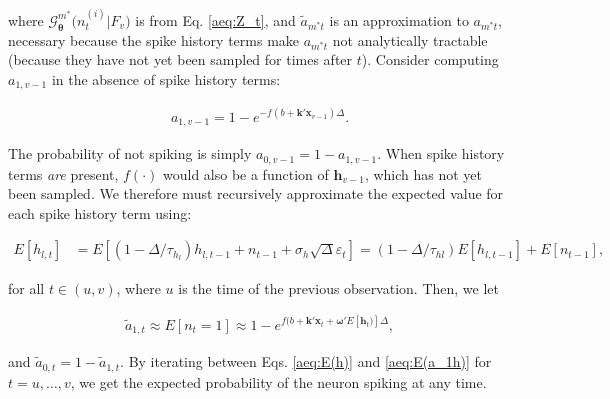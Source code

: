 \documentclass[10pt]{article}
\providecommand{\ve}[1]{\boldsymbol{#1}}
\providecommand{\ve}[1]{\boldsymbol{#1}}
\newcommand{\thetn}{\ve{\theta}}
\newcommand{\m}{m^{\ast}}
\begin{document}
%
\noindent where $\mathcal{G}_{\thetn}^{\m}\big(n_t^{(i)} | F_v\big)$ is from Eq. \ref{aeq:Z_t}, and $\widetilde{a}_{\m t}$ is an approximation to $a_{\m t}$, necessary because the spike history terms make $a_{\m t}$ not analytically tractable (because they have not yet been sampled for times after $t$).  Consider computing $a_{1,v-1}$ in the absence of spike history terms:

\begin{align} \label{aeq:E(a_1)}
a_{1,v-1} = 1-e^{-f(b+\ve{k}'\ve{x}_{v-1})\Delta}.
\end{align}

\noindent The probability of not spiking is simply $a_{0,v-1}=1-a_{1,v-1}$.  When spike history terms \emph{are} present, $f(\cdot)$ would also be a function of $\ve{h}_{v-1}$, which has not yet been sampled.  We therefore must recursively approximate the expected value for each spike history term using:

\begin{align} \label{aeq:E(h)}
E[h_{l,t}] &= E\left[(1-\Delta/\tau_{h_l}) h_{l,t-1} + n_{t-1} + \sigma_h \sqrt{\Delta}\varepsilon_t\right]  = (1-\Delta/\tau_{hl}) E[h_{l,t-1}] + E[n_{t-1}],
\end{align}

\noindent for all $t\in(u,v)$, where $u$ is the time of the previous observation. Then, we let

\begin{align} \label{aeq:E(a_1h)}
\widetilde{a}_{1,t} \approx E[n_{t}=1] \approx 1-e^{f(b+\ve{k}'\ve{x}_t + \ve{\omega}'E[\ve{h}_t)]\Delta},
\end{align}

\noindent and $\widetilde{a}_{0,t}=1-\widetilde{a}_{1,t}$. By iterating between Eqs. \ref{aeq:E(h)} and \ref{aeq:E(a_1h)} for $t=u,\ldots,v$, we get the expected probability of the neuron spiking at any time.
\end{document}
